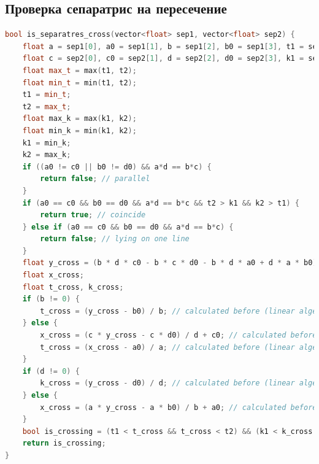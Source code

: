 \subsection{Проверка сепаратрис на пересечение}
\begin{lstlisting}[language=C++]
bool is_separatres_cross(vector<float> sep1, vector<float> sep2) {
	float a = sep1[0], a0 = sep1[1], b = sep1[2], b0 = sep1[3], t1 = sep1[4], t2 = sep1[5];
	float c = sep2[0], c0 = sep2[1], d = sep2[2], d0 = sep2[3], k1 = sep2[4], k2 = sep2[5];
	float max_t = max(t1, t2);
	float min_t = min(t1, t2);
	t1 = min_t;
	t2 = max_t;
	float max_k = max(k1, k2);
	float min_k = min(k1, k2);
	k1 = min_k;
	k2 = max_k;
	if ((a0 != c0 || b0 != d0) && a*d == b*c) {
		return false; // parallel
	}
	if (a0 == c0 && b0 == d0 && a*d == b*c && t2 > k1 && k2 > t1) {
		return true; // coincide
	} else if (a0 == c0 && b0 == d0 && a*d == b*c) {
		return false; // lying on one line
	}
	float y_cross = (b * d * c0 - b * c * d0 - b * d * a0 + d * a * b0) / (d * a - b * c); // calculated before (linear algebra)
	float x_cross;
	float t_cross, k_cross;
	if (b != 0) {
		t_cross = (y_cross - b0) / b; // calculated before (linear algebra)
	} else {
		x_cross = (c * y_cross - c * d0) / d + c0; // calculated before (linear algebra)
		t_cross = (x_cross - a0) / a; // calculated before (linear algebra)
	}
	if (d != 0) {
		k_cross = (y_cross - d0) / d; // calculated before (linear algebra)
	} else {
		x_cross = (a * y_cross - a * b0) / b + a0; // calculated before (linear algebra)
	}
	bool is_crossing = (t1 < t_cross && t_cross < t2) && (k1 < k_cross && k_cross < k2);
	return is_crossing;
}
\end{lstlisting}
